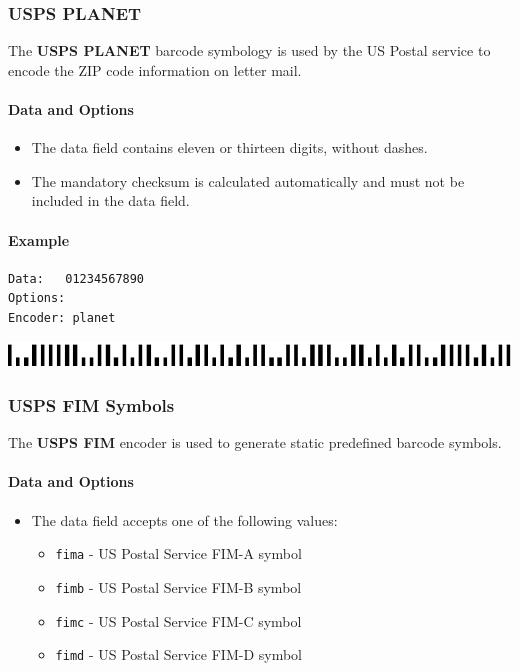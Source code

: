 \hypertarget{usps-planet}{%
\subsubsection{USPS PLANET}\label{usps-planet}}

The \textbf{USPS PLANET} barcode symbology is used by the US Postal
service to encode the ZIP code information on letter mail.

\hypertarget{data-and-options-52}{%
\paragraph{Data and Options}\label{data-and-options-52}}

\begin{itemize}
\tightlist
\item
  The data field contains eleven or thirteen digits, without dashes.
\item
  The mandatory checksum is calculated automatically and must not be
  included in the data field.
\end{itemize}

\hypertarget{example-15}{%
\paragraph{Example}\label{example-15}}

\begin{verbatim}
Data:   01234567890
Options: 
Encoder: planet
\end{verbatim}

\includegraphics{images/planet-1.eps}

\hypertarget{usps-fim-symbols}{%
\subsubsection{USPS FIM Symbols}\label{usps-fim-symbols}}

The \textbf{USPS FIM} encoder is used to generate static predefined
barcode symbols.

\hypertarget{data-and-options-53}{%
\paragraph{Data and Options}\label{data-and-options-53}}

\begin{itemize}
\tightlist
\item
  The data field accepts one of the following values:

  \begin{itemize}
  \tightlist
  \item
    \texttt{fima} - US Postal Service FIM-A symbol
  \item
    \texttt{fimb} - US Postal Service FIM-B symbol
  \item
    \texttt{fimc} - US Postal Service FIM-C symbol
  \item
    \texttt{fimd} - US Postal Service FIM-D symbol
  \end{itemize}
\end{itemize}

